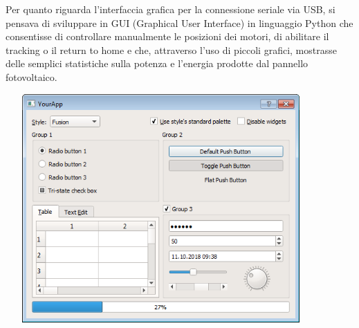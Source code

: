 Per quanto riguarda l'interfaccia grafica per la connessione seriale via
USB, si pensava di sviluppare in GUI (Graphical User Interface) in
linguaggio Python che consentisse di controllare manualmente le
posizioni dei motori, di abilitare il tracking o il return to home e
che, attraverso l'uso di piccoli grafici, mostrasse delle semplici
statistiche sulla potenza e l'energia prodotte dal pannello
fotovoltaico.

\begin{center}
\includegraphics[width=4.68229in,height=3.4426in]{figures/image47.png}
\captionsetup{type=figure}
\end{center}

